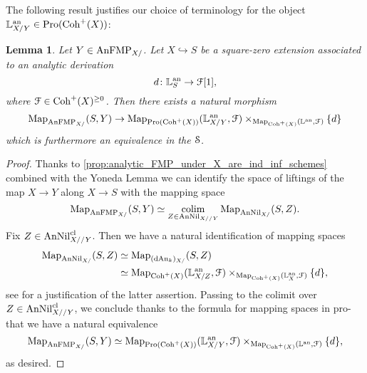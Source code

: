 \documentclass[10pt,a4paper,reqno]{amsart} %
\theoremstyle{plain}
\newtheorem{lem}[thm]{Lemma}
\theoremstyle{definition}
\theoremstyle{remark}
\numberwithin{equation}{section}
\begin{document}
The following result justifies our choice of terminology for the object $\mathbb L^\mathrm{an}_{X/Y} \in \mathrm{Pro}(\mathrm{Coh}^+(X))$:

\begin{lem} \label{lem:pro_cot_complex_classifies_nil_extensions_for_analytic_moduli_problems}
    Let $Y \in \mathrm{AnFMP}_{X/}$. Let $X \hookrightarrow S$ be a square-zero extension associated to an analytic derivation
        \[
            d \colon \mathbb L^\mathrm{an}_S \to \mathcal F [1] ,  
        \]
    where $\mathcal F \in \mathrm{Coh}^+(X)^{\ge 0}$. Then there exists a natural morphism
        \[
            \operatorname{Map}_{\mathrm{AnFMP}_{X/}}(S, Y) \to \operatorname{Map}_{\mathrm{Pro}(\mathrm{Coh}^+(X))}(\mathbb L^\mathrm{an}_{X/Y}, \mathcal F) \times_{\operatorname{Map}_{\mathrm{Coh}^+(X)}(\mathbb L^\mathrm{an}, \mathcal F)} \{ d \}
        \]
    which is furthermore an equivalence in the \infcat $\mathcal S$.
\end{lem}

\begin{proof}
    Thanks to \cref{prop:analytic_FMP_under_X_are_ind_inf_schemes} combined with the Yoneda Lemma
    we can identify the space of liftings of the map $X \to Y$ along $X \to S$ with the mapping space
        \[
            \operatorname{Map}_{\mathrm{AnFMP}_{X/}}(S, Y) \simeq \operatorname*{colim}_{Z \in \mathrm{AnNil}_{X//Y}} \operatorname{Map}_{\mathrm{AnNil}_{X/}} (S, Z).  
        \]
    Fix $Z \in \mathrm{AnNil}_{X//Y}^{\mathrm{cl}}$. Then we have a natural identification of mapping spaces
        \begin{align} \label{eq:identification_of_universal_property_of_rel_an_cotagent_complex}
            \operatorname{Map}_{\mathrm{AnNil}_{X/}} (S, Z) & \simeq \operatorname{Map}_{(\mathrm{dAn}_k)_{X/}} (S, Z) \\
                                      & \simeq \operatorname{Map}_{\mathrm{Coh}^+(X)}(\mathbb L^\mathrm{an}_{X/Z}, \mathcal F) \times_{\operatorname{Map}_{\mathrm{Coh}^+(X)}(\mathbb L^\mathrm{an}_X, \mathcal F)} \{ d \},
        \end{align}
    see \cite[\S 5.4]{Porta_Yu_Representability} for a justification of the latter assertion.
    Passing to the colimit over $Z \in \mathrm{AnNil}_{X//Y}^{\mathrm{cl}}$, we conclude thanks to the formula for mapping spaces in pro-\infcats that we have
    a natural equivalence
        \[
            \operatorname{Map}_{\mathrm{AnFMP}_{X/}}(S, Y) \simeq \operatorname{Map}_{\mathrm{Pro}(\mathrm{Coh}^+(X))}(\mathbb L^\mathrm{an}_{X/Y}, \mathcal F) \times_{\operatorname{Map}_{\mathrm{Coh}^+(X)}(\mathbb L^\mathrm{an}, \mathcal F)} \{ d \},
        \]
    as desired.
\end{proof}
\end{document}
